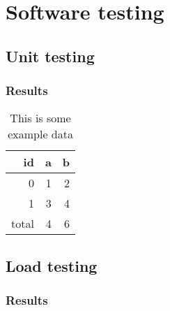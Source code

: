 \chapter{Software testing}
\label{ch:testing}


\section{Unit testing}

\subsection{Results}

\begin{table}[H]
\caption{This is some example data}
\centering
\begin{tabular}{rrr}
\toprule
id & a & b\\
\midrule
0 & 1 & 2\\
1 & 3 & 4\\
\midrule
total & 4 & 6\\
\bottomrule
\end{tabular}
\end{table}

\section{Load testing}

\subsection{Results}
